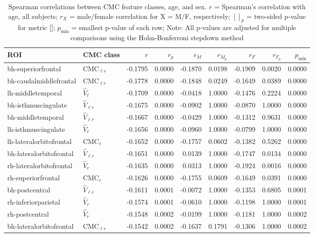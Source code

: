 \documentclass{article}
\begin{document}
\begin{table}
\caption{Spearman correlations between CMC feature classes, age, and sex.
$r$ = Spearman's correlation with age, all subjects;
$r_X$ = male/female correlation for X = M/F, respectively;
$[]_p$ = two-sided p-value for metric [];
$p_{\min}$ = smallest p-value of each row;
Note: All p-values are adjusted for multiple comparisons using the Holm-Bonferroni stepdown method
}
\centering
\begin{tabular}{llrrrrrrr}
	\toprule
	ROI & CMC class & $r$ & $r_p$ & $r_M$ & $r_{M_p}$ & $r_F$ & $r_{F_p}$ & $p_{\min}$ \\
	\midrule
	bh-superiorfrontal & $\text{CMC}_{\ell r}$ & -0.1795 & 0.0000 & -0.1870 & 0.0198 & -0.1909 & 0.0020 & 0.0000 \\
	bh-caudalmiddlefrontal & $\text{CMC}_{\ell r}$ & -0.1778 & 0.0000 & -0.1848 & 0.0249 & -0.1649 & 0.0389 & 0.0000 \\
	lh-middletemporal & $\hat{V}_{\ell}$ & -0.1709 & 0.0000 & -0.0418 & 1.0000 & -0.1476 & 0.2224 & 0.0000 \\
	bh-isthmuscingulate & $\hat{V}_{\ell r}$ & -0.1675 & 0.0000 & -0.0902 & 1.0000 & -0.0870 & 1.0000 & 0.0000 \\
	bh-middletemporal & $\hat{V}_{\ell r}$ & -0.1667 & 0.0000 & -0.0429 & 1.0000 & -0.1312 & 0.9631 & 0.0000 \\
	lh-isthmuscingulate & $\hat{V}_{\ell}$ & -0.1656 & 0.0000 & -0.0960 & 1.0000 & -0.0799 & 1.0000 & 0.0000 \\
	lh-lateralorbitofrontal & $\text{CMC}_{\ell}$ & -0.1652 & 0.0000 & -0.1757 & 0.0602 & -0.1382 & 0.5262 & 0.0000 \\
	bh-lateralorbitofrontal & $\hat{V}_{\ell r}$ & -0.1651 & 0.0000 & 0.0139 & 1.0000 & -0.1747 & 0.0134 & 0.0000 \\
	rh-lateralorbitofrontal & $\hat{V}_{r}$ & -0.1635 & 0.0000 & 0.0313 & 1.0000 & -0.1924 & 0.0016 & 0.0000 \\
	rh-superiorfrontal & $\text{CMC}_r$ & -0.1626 & 0.0000 & -0.1755 & 0.0609 & -0.1649 & 0.0391 & 0.0000 \\
	bh-postcentral & $\hat{V}_{\ell r}$ & -0.1611 & 0.0001 & -0.0072 & 1.0000 & -0.1353 & 0.6805 & 0.0001 \\
	rh-inferiorparietal & $\hat{V}_{r}$ & -0.1574 & 0.0001 & -0.0610 & 1.0000 & -0.1198 & 1.0000 & 0.0001 \\
	rh-postcentral & $\hat{V}_{r}$ & -0.1548 & 0.0002 & -0.0199 & 1.0000 & -0.1181 & 1.0000 & 0.0002 \\
	bh-lateralorbitofrontal & $\text{CMC}_{\ell r}$ & -0.1542 & 0.0002 & -0.1637 & 0.1791 & -0.1306 & 1.0000 & 0.0002 \\

\end{tabular}
\end{table}
\end{document}
